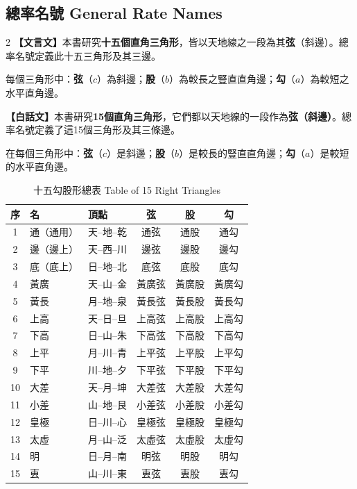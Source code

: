 \documentclass[11pt,a4paper]{article}
\begin{document}
\subsection{總率名號 General Rate Names}
\label{subsec:names}

\begin{paracol}{2}
\textbf{【文言文】}本書研究\textbf{十五個直角三角形}，皆以天地線之一段為其\textbf{弦}（斜邊）。總率名號定義此十五三角形及其三邊。

每個三角形中：\textbf{弦}（$c$）為斜邊；\textbf{股}（$b$）為較長之豎直直角邊；\textbf{勾}（$a$）為較短之水平直角邊。

\switchcolumn
\textbf{【白話文】}本書研究\textbf{15個直角三角形}，它們都以天地線的一段作為\textbf{弦（斜邊）}。總率名號定義了這15個三角形及其三條邊。

在每個三角形中：\textbf{弦}（$c$）是斜邊；\textbf{股}（$b$）是較長的豎直直角邊；\textbf{勾}（$a$）是較短的水平直角邊。
\end{paracol}

\vspace{0.3cm}

\begin{table}[h]
\centering
\caption{十五勾股形總表 Table of 15 Right Triangles}
\begin{tabular}{|c|l|l|c|c|c|}
\hline
\textbf{序} & \textbf{名} & \textbf{頂點} & \textbf{弦} & \textbf{股} & \textbf{勾} \\
\hline
1 & 通（通用） & 天--地--乾 & 通弦 & 通股 & 通勾 \\
2 & 邊（邊上） & 天--西--川 & 邊弦 & 邊股 & 邊勾 \\
3 & 底（底上） & 日--地--北 & 底弦 & 底股 & 底勾 \\
4 & 黃廣 & 天--山--金 & 黃廣弦 & 黃廣股 & 黃廣勾 \\
5 & 黃長 & 月--地--泉 & 黃長弦 & 黃長股 & 黃長勾 \\
6 & 上高 & 天--日--旦 & 上高弦 & 上高股 & 上高勾 \\
7 & 下高 & 日--山--朱 & 下高弦 & 下高股 & 下高勾 \\
8 & 上平 & 月--川--青 & 上平弦 & 上平股 & 上平勾 \\
9 & 下平 & 川--地--夕 & 下平弦 & 下平股 & 下平勾 \\
10 & 大差 & 天--月--坤 & 大差弦 & 大差股 & 大差勾 \\
11 & 小差 & 山--地--艮 & 小差弦 & 小差股 & 小差勾 \\
12 & 皇極 & 日--川--心 & 皇極弦 & 皇極股 & 皇極勾 \\
13 & 太虛 & 月--山--泛 & 太虛弦 & 太虛股 & 太虛勾 \\
14 & 明 & 日--月--南 & 明弦 & 明股 & 明勾 \\
15 & 叀 & 山--川--東 & 叀弦 & 叀股 & 叀勾 \\
\hline
\end{tabular}
\end{table}
\end{document}
